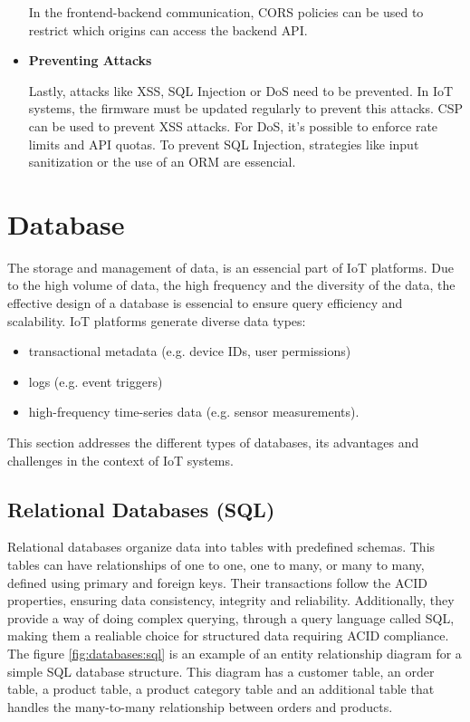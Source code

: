 \begin{itemize}
	      In the frontend-backend communication, \gls{CORS} policies can be used to
	      restrict which origins can access the backend \gls{API}.

	\item \textbf{Preventing Attacks}

	      Lastly, attacks like \gls{XSS}, \gls{SQL} Injection or \gls{DoS} need to be prevented.
	      In \gls{IoT} systems, the firmware must be updated regularly to prevent this
	      attacks.
	      \gls{CSP} can be used to prevent \gls{XSS} attacks. For \gls{DoS}, it's possible to enforce
	      rate limits and \gls{API} quotas. To prevent \gls{SQL} Injection, strategies like
	      input sanitization or the use of an \gls{ORM} are essencial.
\end{itemize}

\section{Database}
The storage and management of data, is an essencial part of \gls{IoT} platforms.
Due to the high volume of data, the high frequency and the diversity of the
data, the effective design of a database is essencial to ensure query efficiency
and scalability.
\gls{IoT} platforms generate diverse data types:
\begin{itemize}
	\item transactional metadata (e.g. device \gls{ID}s, user permissions)
	\item logs (e.g. event triggers)
	\item high-frequency time-series data (e.g. sensor measurements).
\end{itemize}

This section addresses the different types of databases, its advantages and
challenges in the context of \gls{IoT} systems.

\subsection{Relational Databases (SQL)}
Relational databases organize data into tables with predefined schemas.
This tables can have relationships of one to one, one to many, or many to many,
defined using primary and foreign keys. Their transactions follow the \gls{ACID}
properties, ensuring data
consistency, integrity and reliability. Additionally, they provide a way of
doing complex querying, through a query language called \gls{SQL}, making them
a realiable choice for structured data requiring \gls{ACID} compliance. The figure
\ref{fig:databases:sql}
is an example of an entity relationship diagram for a simple \gls{SQL} database structure.
This diagram has a customer table, an order table, a product table, a product
category table and an additional table that handles the many-to-many
relationship between orders and products.


